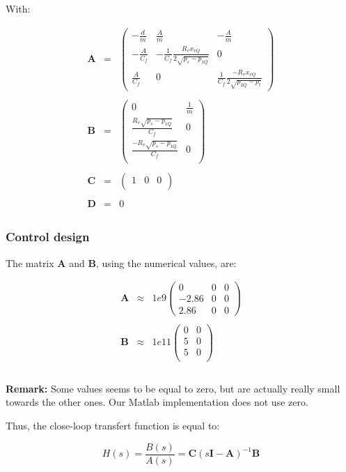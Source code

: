 With:

$$\begin{array}{rcl}
   \bm{A} & = & \left(\begin{array}{ccc} 
   -\frac{d}{m} & \frac{A}{m} & -\frac{A}{m} \\ 
   -\frac{A}{C_f} & -\frac{1}{C_f} \frac{R_v x_{vQ}}{2\sqrt{p_s - p_{1Q}}} & 0 \\ 
   \frac{A}{C_f} & 0 & \frac{1}{C_f} \frac{-R_v x_{vQ}}{2 \sqrt{p_{2Q}-p_t}}
   \end{array}\right) \\ \\
   
   \bm{B} & = & \left(\begin{array}{cc}
   0 & \frac{1}{m} \\
   \frac{R_v \sqrt{p_s - p_{1Q}}}{C_f} & 0 \\
   \frac{-R_v \sqrt{p_s - p_{1Q}}}{C_f} & 0 \\
   \end{array}\right) \\ \\
   
   \bm{C} & = & \left(\begin{array}{ccc}
   1 & 0 & 0\\
   \end{array}\right) \\ \\
   
   \bm{D} & = & 0 \\
  \end{array}$$

\subsubsection*{Control design}

The matrix $\bm{A}$ and $\bm{B}$, using the numerical values, are:

$$\begin{array}{rcl}
   \bm{A} & \approx & 1e9 \left(\begin{array}{ccc} 
   0 & 0 & 0 \\ 
   -2.86 & 0 & 0 \\ 
   2.86 & 0 & 0
   \end{array}\right) \\ \\
   
   \bm{B} & \approx & 1e11 \left(\begin{array}{cc}
   0 & 0 \\
   5 & 0 \\
   5 & 0 \\
   \end{array}\right) \\ \\
  \end{array}$$
  
 \textbf{Remark:} Some values seems to be equal to zero, but are actually really small towards the other ones. Our Matlab implementation does not use zero.
 
 
 
 Thus, the close-loop transfert function is equal to:
 
 $$H(s) = \frac{B(s)}{A(s)} = \bm{C}(s\bm{I}-\bm{A})^{-1}\bm{B}$$